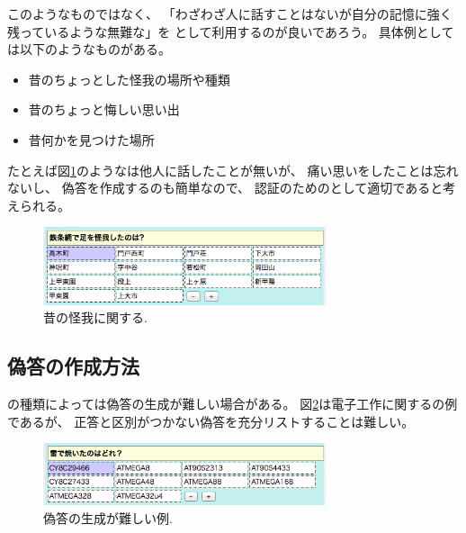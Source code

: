 \documentclass[twoside]{wiss}
\begin{document}
\noindent
このようなものではなく、
「わざわざ人に話すことはないが自分の記憶に強く残っているような無難な{\EM}」を
{\SQ}として利用するのが良いであろう。
具体例としては以下のようなものがある。

\begin{itemize}
\item 昔のちょっとした怪我の場所や種類

\vspace{-1mm}
\item 昔のちょっと悔しい思い出

\vspace{-1mm}
\item 昔何かを見つけた場所
\end{itemize}

たとえば図\ref{kega}のような{\SQ}は他人に話したことが無いが、
痛い思いをしたことは忘れないし、
偽答を作成するのも簡単なので、
認証のための{\SQ}として適切であると考えられる。

\begin{figure}[H]
\centerline{\includegraphics[width=83mm,bb=0 0 502 138]{figures/5c50eed4646232e070646f87b2c8565c.png}}
\caption{昔の怪我に関する{\SQ}.}
\label{kega}
\end{figure}

% 
% 

\subsection{偽答の作成方法}

{\SQ}の種類によっては偽答の生成が難しい場合がある。
図\ref{atmega}は電子工作に関する{\SQ}の例であるが、
正答と区別がつかない偽答を充分リストすることは難しい。

\begin{figure}[H]
\centerline{\includegraphics[width=83mm,bb=0 0 512 113]{figures/2f63ceb9ab6faf8d81393953f2f95a8c.png}}
\caption{偽答の生成が難しい例.}
\label{atmega}
\end{figure}
\end{document}
